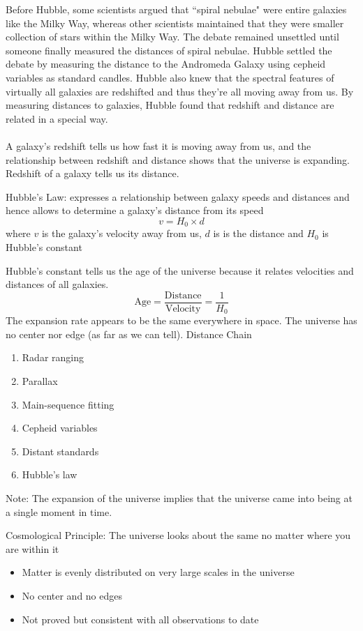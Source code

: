 \documentclass[12pt]{article}
\begin{document}
Before Hubble, some scientists argued that ``spiral nebulae" were entire galaxies like the Milky Way, whereas other scientists maintained that they were smaller collection of stars within the Milky Way. The debate remained unsettled until someone finally measured the distances of spiral nebulae. Hubble settled the debate by measuring the distance to the Andromeda Galaxy using cepheid variables as standard candles. Hubble also knew that the spectral features of virtually all galaxies are redshifted and thus they're all moving away from us. By measuring distances to galaxies, Hubble found that redshift and distance are related in a special way. \\~\\
A galaxy's redshift tells us how fast it is moving away from us, and the relationship between redshift and distance shows that the universe is expanding. Redshift of a galaxy tells us its distance. 
\begin{definition} Hubble's Law: expresses a relationship between galaxy speeds and distances and hence allows to determine a galaxy's distance from its speed $$v = H_0 \times d $$ where $v$ is the galaxy's velocity away from us, $d$ is is the distance and $H_0$ is Hubble's constant \end{definition} 
Hubble's constant tells us the age of the universe because it relates velocities and distances of all galaxies. 
$$ \text{Age} = \frac{\text{Distance}}{\text{Velocity}} = \frac{1}{H_0} $$ 
The expansion rate appears to be the same everywhere in space. The universe has no center nor edge (as far as we can tell). \newpage
Distance Chain \begin{enumerate} 
\item Radar ranging \item Parallax \item Main-sequence fitting \item Cepheid variables \item Distant standards \item Hubble's law \end{enumerate} 
Note: The expansion of the universe implies that the universe came into being at a single moment in time. 
\begin{definition} Cosmological Principle: The universe looks about the same no matter where you are within it \begin{itemize} 
\item Matter is evenly distributed on very large scales in the universe 
\item No center and no edges 
\item Not proved but consistent with all observations to date \end{itemize} \end{definition} 
\end{document}
